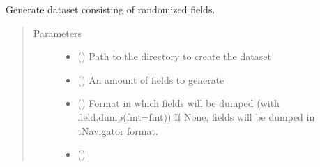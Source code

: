 \documentclass[letterpaper,10pt,english]{sphinxmanual}
\begin{document}
\begin{fulllineitems}
\begin{fulllineitems}
\label{\detokenize{api/randomizers:geology.datasets.FieldRandomizer.default_states_rand}}
\end{fulllineitems}


\begin{fulllineitems}
\label{\detokenize{api/randomizers:geology.datasets.FieldRandomizer.generate_randomized_dataset}}
Generate dataset consisting of randomized fields.
\begin{quote}\begin{description}
\item[{Parameters}] \leavevmode\begin{itemize}
\item {} 
 () \textendash{} Path to the directory to create the dataset

\item {} 
 () \textendash{} An amount of fields to generate

\item {} 
 (\sphinxstyleliteralemphasis{\sphinxupquote{, }}) \textendash{} Format in which fields will be dumped (with field.dump(fmt=fmt))
If None, fields will be dumped in tNavigator format.

\item {} 
 () \textendash{} 


\end{itemize}
\end{description}
\end{quote}
\end{fulllineitems}
\end{fulllineitems}
\end{document}

